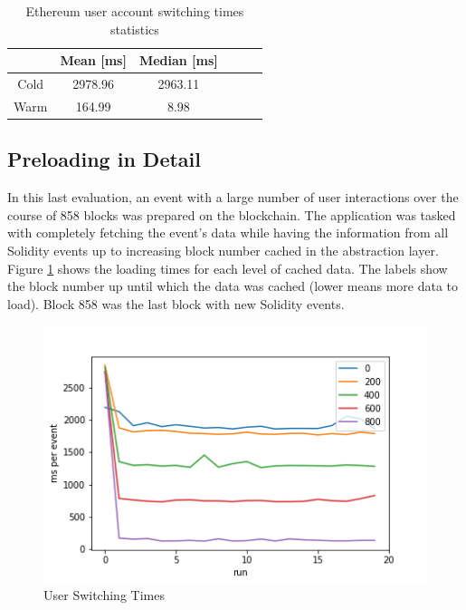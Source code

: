 \begin{table}[ht]
\centering
\begin{tabular}{|c|c|c|c|c|c|}
\hline
 & \textbf{Mean [ms]} & \textbf{Median [ms]} \\ \hline
Cold & 2978.96            & 2963.11     \\ \hline
Warm & 164.99           &  8.98      \\ \hline
\end{tabular}
\caption{Ethereum user account switching times statistics}
\label{tab:baseline1}
\end{table}


\subsection{Preloading in Detail}\label{section:eval-preloading}


In this last evaluation, an event with a large number of user interactions over the course of 858 blocks was prepared on the blockchain. The application was tasked with completely fetching the event's data while having the information from all Solidity events up to increasing block number cached in the abstraction layer. Figure \ref{img:caching} shows the loading times for each level of cached data. The labels show the block number up until which the data was cached (lower means more data to load). Block 858 was the last block with new Solidity events. 

\begin{figure}[H]
    \centering
    \includegraphics[width=14cm]{images/plot4.png}
    \caption{User Switching Times \protect\footnotemark}
    \label{img:caching}
\end{figure}

